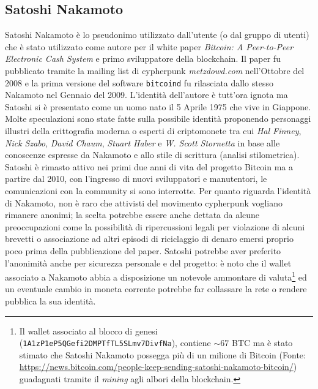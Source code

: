 \appendix
\begin{appendices}
    \chapter{Satoshi Nakamoto}\label{appendix:satoshi}
    Satoshi Nakamoto è lo pseudonimo utilizzato dall'utente (o dal gruppo di utenti) che è stato utilizzato come autore per il white paper \textit{Bitcoin: A Peer-to-Peer Electronic Cash System}\cite{bitcoinwhite} e primo sviluppatore della blockchain.\newline
    Il paper fu pubblicato tramite la mailing list di cypherpunk \textit{metzdowd.com} nell'Ottobre del 2008 e la prima versione del software \texttt{bitcoind} fu rilasciata dallo stesso Nakamoto nel Gennaio del 2009.\newline
    L'identità dell'autore è tutt'ora ignota ma Satoshi si è presentato come un uomo nato il 5 Aprile 1975 che vive in Giappone. Molte speculazioni sono state fatte sulla possibile identità proponendo personaggi illustri della crittografia moderna o esperti di criptomonete tra cui \textit{Hal Finney}, \textit{Nick Szabo}, \textit{David Chaum}, \textit{Stuart Haber} e \textit{W. Scott Stornetta} in base alle conoscenze espresse da Nakamoto e allo stile di scrittura (analisi stilometrica).\newline
    Satoshi è rimasto attivo nei primi due anni di vita del progetto Bitcoin ma a partire dal 2010, con l'ingresso di nuovi sviluppatori e manutentori, le comunicazioni con la community si sono interrotte.\newline
    Per quanto riguarda l'identità di Nakamoto, non è raro che attivisti del movimento cypherpunk vogliano rimanere anonimi; la scelta potrebbe essere anche dettata da alcune preoccupazioni come la possibilità di ripercussioni legali per violazione di alcuni brevetti o associazione ad altri episodi di riciclaggio di denaro emersi proprio poco prima della pubblicazione del paper.\newline
    Satoshi potrebbe aver preferito l'anonimità anche per sicurezza personale e del progetto: è noto che il wallet associato a Nakamoto abbia a disposizione un notevole ammontare di valuta\footnote{Il wallet associato al blocco di genesi (\texttt{1A1zP1eP5QGefi2DMPTfTL5SLmv7DivfNa}), contiene $\sim67$ BTC ma è stato stimato che Satoshi Nakamoto possegga più di un milione di Bitcoin (Fonte: \url{https://news.bitcoin.com/people-keep-sending-satoshi-nakamoto-bitcoin/}) guadagnati tramite il \textit{mining} agli albori della blockchain.} ed un eventuale cambio in moneta corrente potrebbe far collassare la rete o rendere pubblica la sua identità.
\end{appendices}

